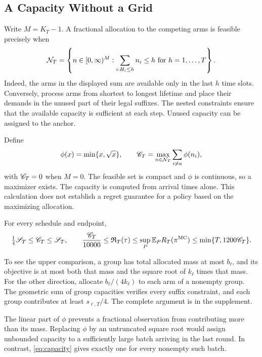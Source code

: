 \subsection{A Capacity Without a Grid}
Write $M=K_T-1$. A fractional allocation to the competing arms is feasible precisely when
\begin{equation}\label{eq:occupancy}
 \mathcal N_T=\left\{n\in[0,\infty)^M:
 \sum_{i:H_i\le h}n_i\le h\ \text{for }h=1,\ldots,T\right\}.
\end{equation}
Indeed, the arms in the displayed sum are available only in the last $h$ time slots. Conversely, process arms from shortest to longest lifetime and place their demands in the unused part of their legal suffixes. The nested constraints ensure that the available capacity is sufficient at each step. Unused capacity can be assigned to the anchor.

Define
\begin{equation}\label{eq:capacity}
 \phi(x)=\min\{x,\sqrt{x}\},\qquad
 \mathscr C_T=\max_{n\in\mathcal N_T}\sum_{i\ne a}\phi(n_i),
\end{equation}
with $\mathscr C_T=0$ when $M=0$. The feasible set is compact and $\phi$ is continuous, so a maximizer exists. The capacity is computed from arrival times alone. This calculation does not establish a regret guarantee for a policy based on the maximizing allocation.

\begin{theorem}\label{thm:capacity}
For every schedule and endpoint,
\begin{equation}\label{eq:capacity-equivalence}
 \tfrac14\mathscr S_T\le\mathscr C_T\le\mathscr S_T,
 \qquad
 \frac{\mathscr C_T}{10000}\le\mathfrak R_T(\tau)
 \le\sup_P\mathbb E_P R_T(\pi^{\mathrm{MC}})
 \le\min\{T,1200\mathscr C_T\}.
\end{equation}
\end{theorem}

To see the upper comparison, a group has total allocated mass at most $b_\ell$, and its objective is at most both that mass and the square root of $k_\ell$ times that mass. For the other direction, allocate $b_\ell/(4k_\ell)$ to each arm of a nonempty group. The geometric sum of group capacities verifies every suffix constraint, and each group contributes at least $s_{\ell,T}/4$. The complete argument is in the supplement.

The linear part of $\phi$ prevents a fractional observation from contributing more than its mass. Replacing $\phi$ by an untruncated square root would assign unbounded capacity to a sufficiently large batch arriving in the last round. In contrast, \eqref{eq:capacity} gives exactly one for every nonempty such batch.
